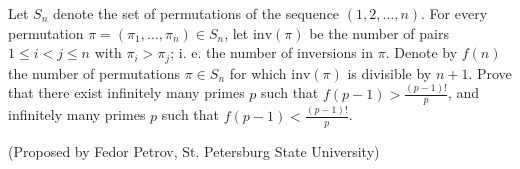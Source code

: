 Let $S_n$ denote the set of permutations of the sequence $(1,2,\dots, n)$. For every permutation $\pi=(\pi_1, \dots, \pi_n)\in S_n$, let $\mathrm{inv}(\pi)$ be the number of pairs $1\le i < j \le n$ with $\pi_i>\pi_j$; i. e. the number of inversions in $\pi$. Denote by $f(n)$ the number of permutations $\pi\in S_n$ for which $\mathrm{inv}(\pi)$ is divisible by $n+1$.
Prove that there exist infinitely many primes $p$ such that $f(p-1)>\frac{(p-1)!}{p}$, and infinitely many primes $p$ such that $f(p-1)<\frac{(p-1)!}{p}$.

(Proposed by Fedor Petrov, St. Petersburg State University)